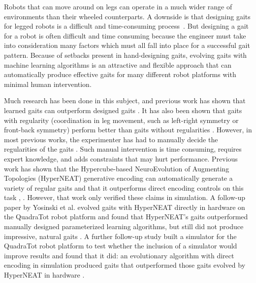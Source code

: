 Robots that can move around on legs can operate in a much wider range of environments than their wheeled counterparts. A downside is that designing gaits for legged robots is a difficult and time-consuming process~\cite{storm:green}. 
But designing a gait for a robot is often difficult and time consuming because the engineer must take into consideration many factors which must all fall into place for a successful gait pattern. 
Because of setbacks present in hand-designing gaits, evolving gaits with machine learning algorithms is an attractive and flexible approach that can automatically produce effective gaits for many different robot platforms with minimal human intervention. 

Much research has been done in this subject, and previous work has shown that learned gaits can outperform designed gaits \cite{valsalam:mii,kohl:stone,hornby1,hornby2}. %
It has also been shown that gaits with regularity (coordination in leg movement, such as left-right symmetry or front-back symmetry) perform better than gaits without regularities \cite{valsalam:mii,clune2,clune1,clune3}. %
However, in most previous works, the experimenter has had to manually decide the regularities of the gaits \cite{valsalam:mii,tellez,beer,raibert} . %
Such manual intervention is time consuming, requires expert knowledge, and adds constraints that may hurt performance. 
Previous work has shown that the Hypercube-based NeuroEvolution of Augmenting Topologies (HyperNEAT) generative encoding \cite{stanley1} can automatically generate a variety of regular gaits and that it outperforms direct encoding controls on this task \cite{clune1}, \cite{clune2}. 
However, that work only verified these claims in simulation. 
A follow-up paper by Yosinski et al. evolved gaits with HyperNEAT directly in hardware on the QuadraTot robot platform and found that HyperNEAT's gaits outperformed manually designed parameterized learning algorithms, but still did not produce impressive, natural gaits \cite{yos:clune}. 
A further follow-up study built a simulator for the QuadraTot robot platform to test whether the inclusion of a simulator would improve results and found that it did:  an evolutionary algorithm with direct encoding in simulation produced gaits that outperformed those gaits evolved by HyperNEAT in hardware \cite{glette}. %
